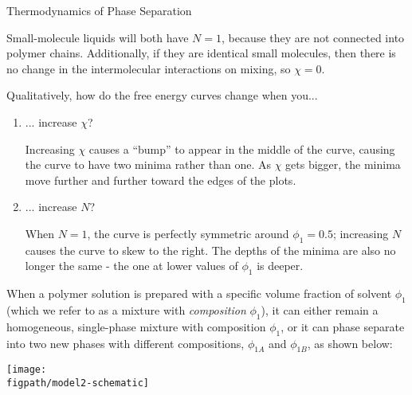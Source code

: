 \begin{activity}{Thermodynamics of Phase Separation}
\begin{ctqs}
\begin{solution}[1.5in]{}
			Small-molecule liquids will both have $N=1$, because they are not connected into polymer chains.  Additionally, if they are identical small molecules, then there is no change in the intermolecular interactions on mixing, so $\chi=0$.
			
		\end{solution}
	
	\question Qualitatively, how do the free energy curves change when you...
		\begin{enumerate}
			\item ... increase $\chi$?
	
				\begin{solution}[0.75in]{}
				
					Increasing $\chi$ causes a ``bump'' to appear in the middle of the curve, causing the curve to have two minima rather than one.  As $\chi$ gets bigger, the minima move further and further toward the edges of the plots.
				
				\end{solution}
				
			\item ... increase $N$?
	
				\begin{solution}[0.75in]{}
			
					When $N=1$, the curve is perfectly symmetric around $\phi_1=0.5$; increasing $N$ causes the curve to skew to the right.  The depths of the minima are also no longer the same - the one at lower values of $\phi_1$ is deeper.
				
				\end{solution}
		
		\end{enumerate}
		
\end{ctqs}



\begin{model}

	When a polymer solution is prepared with a specific volume fraction of solvent $\phi_1$ (which we refer to as a mixture with \emph{composition} $\phi_1$), it can either remain a homogeneous, single-phase mixture with composition $\phi_1$, or it can phase separate into two new phases with different compositions, $\phi_{1A}$ and $\phi_{1B}$, as shown below:
	
		\centerline{\texttt{[image: \\figpath/model2-schematic]}}
	

\end{model}
\end{activity}
